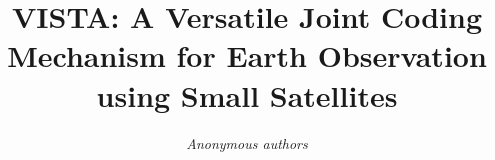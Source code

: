 \documentclass[conference]{IEEEtran}
\begin{document}
\title{VISTA: A Versatile Joint Coding Mechanism for Earth Observation using Small Satellites}

\author{\emph{Anonymous authors}}

\maketitle
\end{document}
